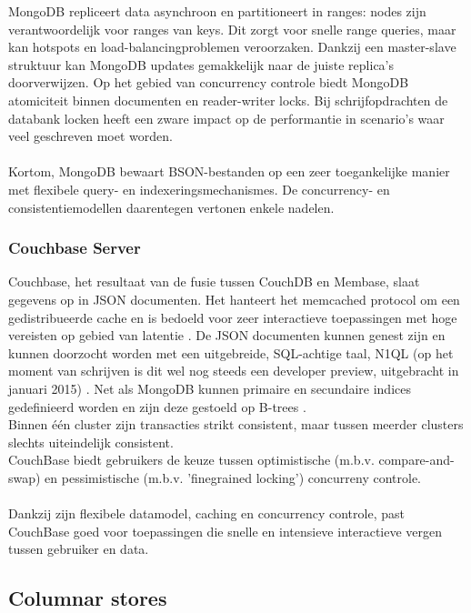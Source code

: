 MongoDB repliceert data asynchroon en partitioneert in ranges: nodes zijn verantwoordelijk voor ranges van keys. Dit zorgt voor snelle range queries, maar kan hotspots en load-balancingproblemen veroorzaken. Dankzij een master-slave struktuur kan MongoDB updates gemakkelijk naar de juiste replica's doorverwijzen.
Op het gebied van concurrency controle biedt MongoDB atomiciteit binnen documenten en reader-writer locks. 
Bij schrijfopdrachten de databank locken heeft een zware impact op de performantie in scenario's waar veel geschreven moet worden.\\\\
Kortom, MongoDB bewaart BSON-bestanden op een zeer toegankelijke manier met flexibele query- en indexeringsmechanismes. De concurrency- en consistentiemodellen daarentegen vertonen enkele nadelen.

\subsubsection{Couchbase Server}

Couchbase, het resultaat van de fusie tussen CouchDB en Membase, slaat gegevens op in JSON documenten. Het hanteert het memcached protocol om een gedistribueerde cache en is bedoeld voor zeer interactieve toepassingen met hoge vereisten op gebied van latentie \cite{grolinger2013data}\cite{couchbase_about}.
De JSON documenten kunnen genest zijn en kunnen doorzocht worden met een uitgebreide, SQL-achtige taal, N1QL (op het moment van schrijven is dit wel nog steeds een developer preview, uitgebracht in januari 2015) \cite{couchbase_n1ql}.
Net als MongoDB kunnen primaire en secundaire indices gedefinieerd worden en zijn deze gestoeld op B-trees \cite{couchbase_index}.\\
Binnen \'e\'en cluster zijn transacties strikt consistent, maar tussen meerder clusters slechts uiteindelijk consistent.\\
CouchBase biedt gebruikers de keuze tussen optimistische (m.b.v. compare-and-swap) en pessimistische (m.b.v. 'finegrained locking') concurreny controle.\\\\
Dankzij zijn flexibele datamodel, caching en concurrency controle, past CouchBase goed voor toepassingen die snelle en intensieve interactieve vergen tussen gebruiker en data.

\subsection{Columnar stores}

